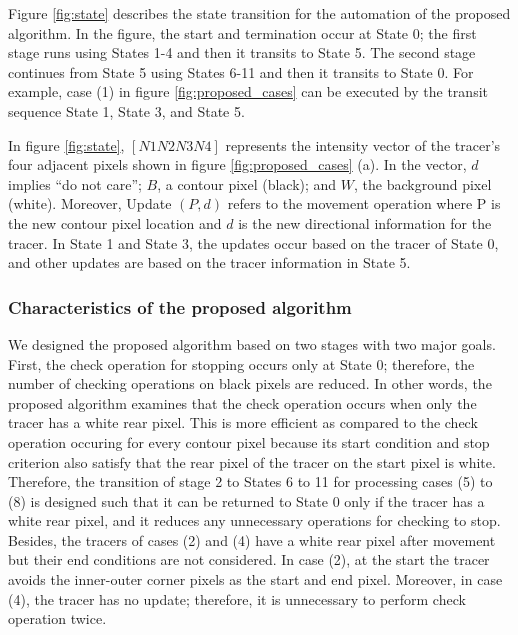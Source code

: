 Figure \ref{fig:state} describes the state transition for the automation of the proposed algorithm. In the figure, the start and termination occur at State 0; the first stage runs using States 1-4 and then it transits to State 5. The second stage continues from State 5 using States 6-11 and then it transits to State 0. For example, case (1) in figure \ref{fig:proposed_cases} can be executed by the transit sequence State 1, State 3, and State 5. 

In figure \ref{fig:state}, $[N1 N2 N3 N4]$ represents the intensity vector of the tracer's four adjacent pixels shown in figure \ref{fig:proposed_cases} (a). In the vector, $d$ implies ``do not care''; $B$, a contour pixel (black); and $W$, the background pixel (white). Moreover, Update $(P,d)$ refers to the movement operation where P is the new contour pixel location and $d$ is the new directional information for the tracer. In State 1 and State 3, the updates occur based on the tracer of State 0, and other updates are based on the tracer information in State 5.

\subsubsection{Characteristics of the proposed algorithm}

We designed the proposed algorithm based on two stages with two major goals. First, the check operation for stopping occurs only at State 0; therefore, the number of checking operations on black pixels are reduced. In other words, the proposed algorithm examines that the check operation occurs when only the tracer has a white rear pixel. This is more efficient as compared to the check operation occuring for every contour pixel because its start condition and stop criterion also satisfy that the rear pixel of the tracer on the start pixel is white. Therefore, the transition of stage 2 to States 6 to 11 for processing cases (5) to (8) is designed such that it can be returned to State 0 only if the tracer has a white rear pixel, and it reduces any unnecessary operations for checking to stop. Besides, the tracers of cases (2) and (4) have a white rear pixel after movement but their end conditions are not considered. In case (2), at the start the tracer avoids the inner-outer corner pixels as the start and end pixel. Moreover, in case (4), the tracer has no update; therefore, it is unnecessary to perform check operation twice. 

